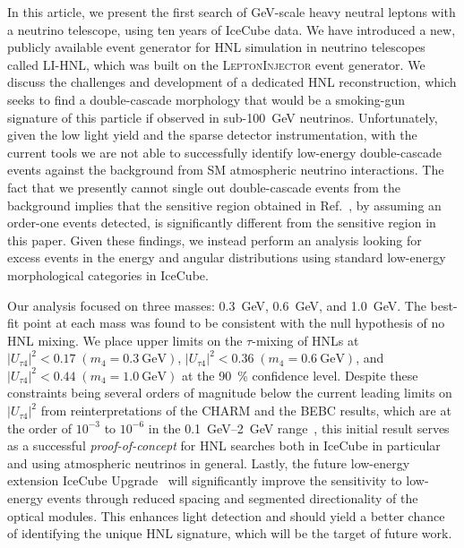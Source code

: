 \documentclass[
    aps,
    prd,
    reprint,
    amsmath,
    amssymb,
    nofootinbib,
    superscriptaddress,
    floatfix
]{revtex4-2}
\newcommand{\gev}{\giga\electronvolt}
\def\ut4{$|U_{\tau4}|^2$}
\def\nomathut4{|U_{\tau4}|^2}
\begin{document}
In this article, we present the first search of GeV-scale heavy neutral leptons with a neutrino telescope, using ten years of IceCube data.
We have introduced a new, publicly available event generator for HNL simulation in neutrino telescopes called \textsc{LI-HNL}, which was built on the \textsc{LeptonInjector} event generator.
We discuss the challenges and development of a dedicated HNL reconstruction, which seeks to find a double-cascade morphology that would be a smoking-gun signature of this particle if observed in sub-\SI{100}{\gev} neutrinos.
Unfortunately, given the low light yield and the sparse detector instrumentation, with the current tools we are not able to successfully identify low-energy double-cascade events against the background from SM atmospheric neutrino interactions.
The fact that we presently cannot single out double-cascade events from the background implies that the sensitive region obtained in Ref.~\cite{Coloma:2017ppo}, by assuming an order-one events detected, is significantly different from the sensitive region in this paper.
Given these findings, we instead perform an analysis looking for excess events in the energy and angular distributions using standard low-energy morphological categories in IceCube.

Our analysis focused on three masses: \SI{0.3}{\gev}, \SI{0.6}{\gev}, and \SI{1.0}{\gev}. 
The best-fit point at each mass was found to be consistent with the null hypothesis of no HNL mixing.
We place upper limits on the $\tau$-mixing of HNLs at $\nomathut4 < 0.17\;(m_4 = \SI{0.3}{\gev})$, $\nomathut4 < 0.36\;(m_4 = \SI{0.6}{\gev})$, and $\nomathut4 < 0.44\;(m_4 = \SI{1.0}{\gev})$ at the \SI{90}{\percent} confidence level.
Despite these constraints being several orders of magnitude below the current leading limits on \ut4 from reinterpretations of the CHARM and the BEBC results, which are at the order of $10^{-3}$ to $10^{-6}$ in the \SIrange{0.1}{2}{\gev} range~\cite{Orloff:2002de, Boiarska:2021yho, Barouki:2022bkt}, this initial result serves as a successful \textit{proof-of-concept} for HNL searches both in IceCube in particular and using atmospheric neutrinos in general.
Lastly, the future low-energy extension IceCube Upgrade~\cite{Ishihara:2019aao} will significantly improve the sensitivity to low-energy events through reduced spacing and segmented directionality of the optical modules.
This enhances light detection and should yield a better chance of identifying the unique HNL signature, which will be the target of future work.
\end{document}
